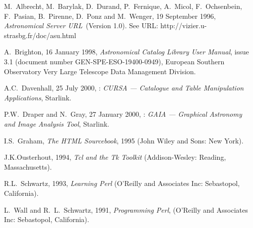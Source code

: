 \documentclass[twoside,11pt,nolof,chapters]{starlink}
\begin{document}
\newpage
{}
\begin{thebibliography}{99}

   M.~Albrecht, M.~Barylak, D.~Durand, P.~Fernique,
   A.~Micol, F.~Ochsenbein, F.~Pasian, B.~Pirenne, D.~Ponz and
   M.~Wenger, 19 September 1996, \textit{Astronomical Server URL}\,
   (Version 1.0).  See URL: 
   {http://vizier.u-strasbg.fr/doc/asu.html}

   A.~Brighton, 16 January 1998, \textit{Astronomical
   Catalog Library User Manual}, issue 3.1 (document number
   GEN-SPE-ESO-19400-0949), European Southern Observatory Very Large
   Telescope Data Management Division.

   A.C.~Davenhall, 25 July 2000,
   : \textit{CURSA --- Catalogue and Table
    Manipulation Applications}, Starlink.

   P.W.~Draper and N.~Gray, 27 January 2000,
   : \textit{GAIA --- Graphical Astronomy and
   Image Analysis Tool}, Starlink.

   I.S.~Graham, \textit{The HTML Sourcebook}, 1995 (John
   Wiley and Sons: New York).

   J.K.Ousterhout, 1994, \textit{Tcl and the Tk
   Toolkit}\/ (Addison-Wesley: Reading, Massachusetts).

   R.L.~Schwartz, 1993, \textit{Learning Perl}
   (O'Reilly and Associates Inc: Sebastopol, California).

   L.~Wall and R.~L.~Schwartz, 1991, \textit{Programming
   Perl}, (O'Reilly and Associates Inc: Sebastopol, California).

\end{thebibliography}

\typeout{  }
\typeout{*****************************************************}
\typeout{  }
\typeout{  }
\typeout{*****************************************************}
\typeout{  }
\end{document}
